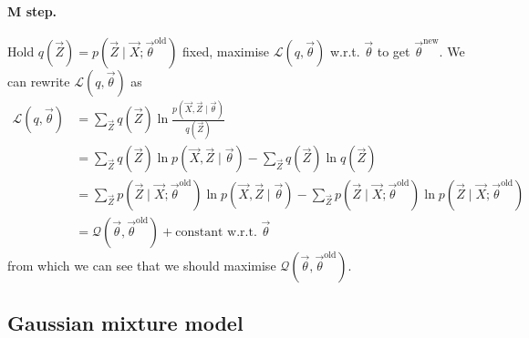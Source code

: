 \paragraph{M step.} Hold $q(\vec Z) = p(\vec Z \mid \vec X; \vec \theta^{\text{old}})$ fixed, maximise $\mathcal L\left(q, \vec \theta\right)$ w.r.t. $\vec \theta$ to get $\vec \theta^{\text{new}}$. We can rewrite $\mathcal L\left(q, \vec \theta\right)$ as
\begin{align*}
    \mathcal L\left(q, \vec \theta\right)   &= \sum_{\vec Z} q(\vec Z) \ln \frac{p(\vec X, \vec Z \mid \vec \theta)}{q(\vec Z)} \\
                                            &= \sum_{\vec Z} q(\vec Z) \ln p\left(\vec X, \vec Z \mid \vec \theta\right) - \sum_{\vec Z} q(\vec Z) \ln q(\vec Z) \\
                                            &= \sum_{\vec Z} p\left(\vec Z \mid \vec X; \vec \theta^{\text{old}}\right) \ln p\left(\vec X, \vec Z \mid \vec \theta\right) - \sum_{\vec Z} p\left(\vec Z \mid \vec X; \vec \theta^{\text{old}}\right) \ln p\left(\vec Z \mid \vec X; \vec \theta^{\text{old}}\right) \\
                                            &= \mathcal Q\left(\vec \theta, \vec \theta^{\text{old}}\right) + \text{constant w.r.t. } \vec \theta
\end{align*}
from which we can see that we should maximise $\mathcal Q\left(\vec \theta, \vec \theta^{\text{old}}\right)$.
\subsection{Gaussian mixture model}
